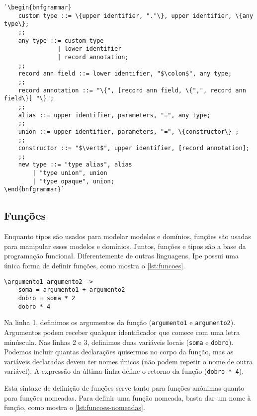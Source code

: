 \begin{lstlisting}[label={grammar:custom-types},caption={Definição de novos tipos em EBNF},escapechar=`,numbers=none]
`\begin{bnfgrammar}
    custom type ::= \{upper identifier, "."\}, upper identifier, \{any type\};
    ;;
    any type ::= custom type
               | lower identifier
               | record annotation;
    ;;
    record ann field ::= lower identifier, "$\colon$", any type;
    ;;
    record annotation ::= "\{", [record ann field, \{",", record ann field\}] "\}";
    ;;
    alias ::= upper identifier, parameters, "=", any type;
    ;;
    union ::= upper identifier, parameters, "=", \{constructor\}-;
    ;;
    constructor ::= "$\vert$", upper identifier, [record annotation];
    ;;
    new type ::= "type alias", alias
        | "type union", union
        | "type opaque", union;
\end{bnfgrammar}`
\end{lstlisting}

\subsection{Funções}

Enquanto tipos são usados para modelar modelos e domínios, funções são
usadas para manipular esses modelos e domínios. Juntos, funções e tipos são a
base da programação funcional. Diferentemente de outras linguagens, Ipe possui
uma única forma de definir funções, como mostra o \autoref{lst:funcoes}.

\begin{lstlisting}[label={lst:funcoes},caption={Exemplo de como definir uma função}]
\argumento1 argumento2 ->
    soma = argumento1 + argumento2
    dobro = soma * 2
    dobro * 4
\end{lstlisting}

Na linha 1, definimos os argumentos da função (\texttt{argumento1} e \texttt{argumento2}).
Argumentos podem receber qualquer identificador que comece com uma letra minúscula.
Nas linhas 2 e 3, definimos duas variáveis locais (\texttt{soma} e \texttt{dobro}).
Podemos incluir quantas declarações quisermos no corpo da função, mas as variáveis
declaradas devem ter nomes únicos (não podem repetir o nome de outra variável). A
expressão da última linha define o retorno da função (\texttt{dobro * 4}).

Esta sintaxe de definição de funções serve tanto para funções anônimas quanto para
funções nomeadas. Para definir uma função nomeada, basta dar um nome à função, como
mostra o \autoref{lst:funcoes-nomeadas}.

